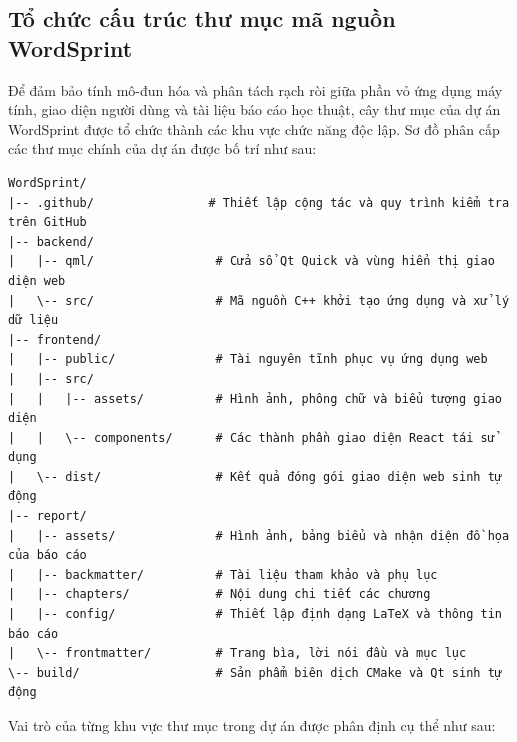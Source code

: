 \subsection{Tổ chức cấu trúc thư mục mã nguồn WordSprint}
\label{subsec:project_structure}
Để đảm bảo tính mô-đun hóa và phân tách rạch ròi giữa phần vỏ ứng dụng máy tính, giao diện người dùng và tài liệu báo cáo học thuật, cây thư mục của dự án WordSprint được tổ chức thành các khu vực chức năng độc lập. Sơ đồ phân cấp các thư mục chính của dự án được bố trí như sau:

\begin{lstlisting}[caption={Cấu trúc thư mục tổ chức mã nguồn dự án WordSprint}, label={lst:project_structure}]
WordSprint/
|-- .github/                # Thiết lập cộng tác và quy trình kiểm tra trên GitHub
|-- backend/
|   |-- qml/                 # Cửa sổ Qt Quick và vùng hiển thị giao diện web
|   \-- src/                 # Mã nguồn C++ khởi tạo ứng dụng và xử lý dữ liệu
|-- frontend/
|   |-- public/              # Tài nguyên tĩnh phục vụ ứng dụng web
|   |-- src/
|   |   |-- assets/          # Hình ảnh, phông chữ và biểu tượng giao diện
|   |   \-- components/      # Các thành phần giao diện React tái sử dụng
|   \-- dist/                # Kết quả đóng gói giao diện web sinh tự động
|-- report/
|   |-- assets/              # Hình ảnh, bảng biểu và nhận diện đồ họa của báo cáo
|   |-- backmatter/          # Tài liệu tham khảo và phụ lục
|   |-- chapters/            # Nội dung chi tiết các chương
|   |-- config/              # Thiết lập định dạng LaTeX và thông tin báo cáo
|   \-- frontmatter/         # Trang bìa, lời nói đầu và mục lục
\-- build/                   # Sản phẩm biên dịch CMake và Qt sinh tự động
\end{lstlisting}

Vai trò của từng khu vực thư mục trong dự án được phân định cụ thể như sau:

